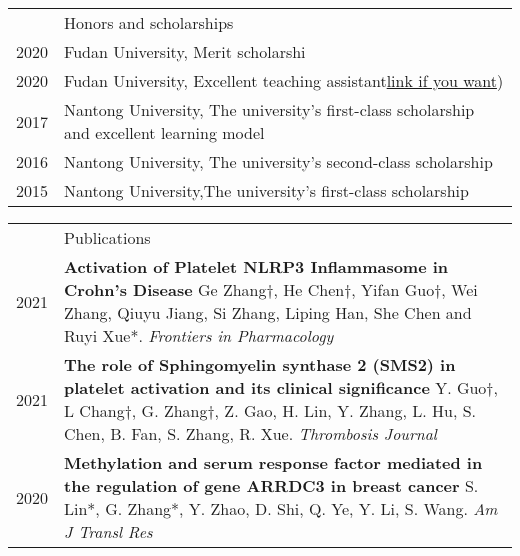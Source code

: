 \documentclass[letterpaper, 11pt]{article}
\newcommand{\headingfont}{\Large\color{OliveGreen}}
\newenvironment{SectionTable}[1]{
	\renewcommand*{\arraystretch}{1.7}
	\setlength{\tabcolsep}{10pt}
	\begin{longtable}{Rp{5.2in}} & #1 \\}
{\end{longtable}\vspace{-.3cm}}
\newenvironment{SectionTableSingleSpace}[1]{
	\renewcommand*{\arraystretch}{1.2}
	\setlength{\tabcolsep}{10pt}
	\begin{longtable}{Rp{5.2in}} & #1 \\[0.6em]}
{\end{longtable}\vspace{-.3cm}}
\begin{document}
\begin{SectionTableSingleSpace}{\headingfont Honors and scholarships}
2020 & 
Fudan University, Merit scholarshi \\

2020 &
Fudan University, Excellent teaching assistant\href{https://en.wikibooks.org/wiki/LaTeX/Hyperlinks}{link if you want}) \\

2017 &
Nantong University, The university's first-class scholarship and excellent learning model \\

2016 &
Nantong University, The university's second-class scholarship  \\

2015 &
Nantong University,The university's first-class scholarship 
\end{SectionTableSingleSpace}


\begin{SectionTable}{\headingfont Publications} 
2021 & 
\textbf{Activation of Platelet NLRP3 Inflammasome in Crohn’s Disease} \newline
Ge Zhang†, He Chen†, Yifan Guo†, Wei Zhang, Qiuyu Jiang, Si Zhang, Liping Han, She Chen and Ruyi Xue*. \newline
\textit{Frontiers in Pharmacology} \\

2021 & 
\textbf{The role of Sphingomyelin synthase 2 (SMS2) in platelet activation and its clinical significance} \newline
Y. Guo†, L Chang†, G. Zhang†, Z. Gao, H. Lin, Y. Zhang, L. Hu, S. Chen, B. Fan, S. Zhang, R. Xue. \newline
\textit{Thrombosis Journal} \\

2020 & 
\textbf{Methylation and serum response factor mediated in the regulation of gene ARRDC3 in breast cancer} \newline
S. Lin*, G. Zhang*, Y. Zhao, D. Shi, Q. Ye, Y. Li, S. Wang. \newline
\textit{Am J Transl Res}

\end{SectionTable}

\end{document}
